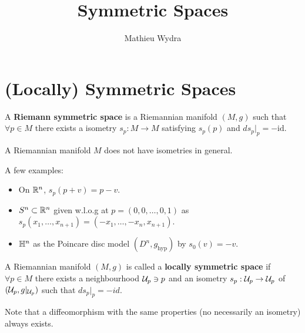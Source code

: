 \documentclass[10pt,a4paper]{article}
\title{Symmetric Spaces}
\date{}
\author{Mathieu Wydra}
\begin{document}
\maketitle	
\section{(Locally) Symmetric Spaces}
\begin{defn}
A \textbf{Riemann symmetric space} is a Riemannian manifold $(M,g)$ such that $\forall p\in M$ there exists a isometry $s_p: M\to M$ satisfying $s_p(p)$ and $ds_p\vert_p = -\text{id}$.
\end{defn}

\begin{remark}
A Riemannian manifold $M$ does not have isometries in general.
\end{remark}

A few examples:

\begin{example}
\begin{itemize}
\item On $\mathbb{R}^n$, $s_p(p+v) = p-v$.
\item $S^n\subset \mathbb{R}^n$ given w.l.o.g at $p=(0,0,\ldots,0,1)$ as $s_p(x_1,\ldots,x_{n+1}) = (-x_1,\ldots,-x_n,x_{n+1})$.
\item $\mathbb{H}^n$ as the Poincare disc model $(D^n,g_{\text{hyp}})$ by $s_0(v) = -v$.
\end{itemize}
\end{example}

\begin{defn}
A Riemannian manifold $(M,g)$ is called a \textbf{locally symmetric space} if $\forall p\in M$ there exists a neighbourhood $\mathcal{U}_p\ni p$ and an isometry $s_p:\mathcal{U}_p\to \mathcal{U}_p$ of $(\mathcal{U}_p,g\vert_{\mathcal{U}_p})$ such that $ds_p\vert_p = -id$.
\end{defn}
Note that a diffeomorphism with the same properties (no necessarily an isometry) always exists.
\end{document}
